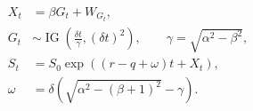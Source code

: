 \documentclass{equation-sheet}
\begin{document}
\begin{equation*}
\begin{aligned}
X_t &= \beta G_t + W_{G_t}, \\
G_t &\sim \operatorname{IG}\!\left(\frac{\delta t}{\gamma},(\delta t)^2\right),
\qquad \gamma=\sqrt{\alpha^2-\beta^2}, \\
S_t &= S_0\exp\!\left((r-q+\omega)t+X_t\right), \\
\omega &= \delta\!\left(
  \sqrt{\alpha^2-(\beta+1)^2}-\gamma
\right).
\end{aligned}
\end{equation*}
\end{document}
